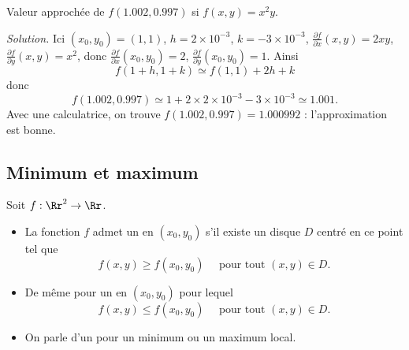 \documentclass[11pt,class=report,crop=false]{standalone}
\begin{document}


\begin{exemple}
Valeur approchée de $f(1.002, 0.997)$ si $f(x,y) = x^2y$.
\bigskip

\emph{Solution.}
Ici $(x_0,y_0) = (1,1)$, $h = 2 \times 10^{-3}$, $k = -3 \times 10^{-3}$,
$\frac{\partial f}{\partial x}(x,y) = 2xy$, $\frac{\partial f}{\partial y}(x,y) = x^2$, donc $\frac{\partial f}{\partial x}(x_0,y_0) = 2$, $\frac{\partial f}{\partial y}(x_0,y_0) = 1$. Ainsi
$$f(1+h,1+k) \simeq f(1,1) + 2h + k$$
donc 
$$f(1.002, 0.997) \simeq 1 + 2 \times 2 \times 10^{-3} - 3 \times 10^{-3} \simeq 1.001.$$
Avec une calculatrice, on trouve $f(1.002, 0.997) = 1.000992$ : l'approximation est bonne.
\end{exemple}


\subsection{Minimum et maximum}

\begin{definition}
Soit $f : \Rr^2 \to \Rr$.
\begin{itemize}
  \item La fonction $f$ admet un  en $(x_0,y_0)$ s'il existe un disque $D$ centré en ce point tel que 
$$ f(x,y) \ge f(x_0,y_0) \quad \text{ pour tout } (x,y) \in D.$$
  \item De même pour un  en $(x_0,y_0)$  pour lequel 
$$f(x,y) \le f(x_0,y_0) \quad \text{ pour tout } (x,y) \in D.$$
  \item On parle d'un  pour un minimum ou un maximum local.
\end{itemize}
\end{definition}

\end{document}
